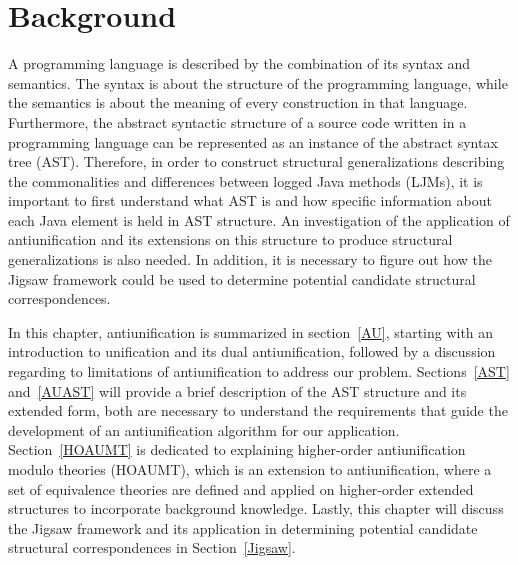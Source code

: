 \chapter{Background}  \label{background}


A programming language is described by the combination of its syntax and semantics. The syntax is about the structure of the programming language, while the semantics is about the meaning of every construction in that language. Furthermore, the abstract syntactic structure of a source code written in a programming language can be represented as an instance of the abstract syntax tree (AST). Therefore, in order to construct structural generalizations describing the commonalities and differences between logged Java methods (LJMs), it is important to first understand what AST is and how specific information about each Java element is held in AST structure. An investigation of the application of antiunification and its extensions on this structure to produce structural generalizations is also needed. In addition, it is necessary to figure out how the Jigsaw framework could be used to determine potential candidate structural correspondences.


In this chapter, antiunification is summarized in section~\ref{AU}, starting with an introduction to unification and its dual antiunification, followed by a discussion regarding to limitations of antiunification to address our problem.
Sections~\ref{AST} and~\ref{AUAST} will provide a brief description of the AST structure and its extended form, both are necessary to understand the requirements that guide the development of an antiunification algorithm for our application.
Section~\ref{HOAUMT} is dedicated to explaining higher-order antiunification modulo theories (HOAUMT), which is an extension to antiunification, where a set of equivalence theories are defined and applied on higher-order extended structures to incorporate background knowledge.
Lastly, this chapter will discuss the Jigsaw framework and its application in determining potential candidate structural correspondences in Section~\ref{Jigsaw}.


